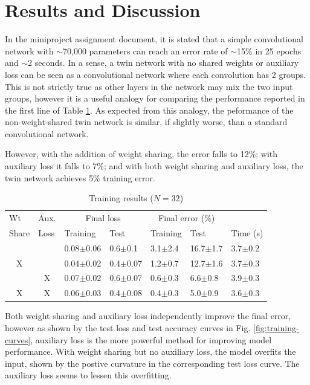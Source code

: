 \documentclass[prl, article, twocolumn]{revtex4-1}
\begin{document}
\section{Results and Discussion}
In the miniproject assignment document, it is stated that a simple convolutional network with $\sim$70,000 parameters can reach an error rate of $\sim$15\% in 25 epochs and $\sim$2 seconds. In a sense, a twin network with no shared weights or auxiliary loss can be seen as a convolutional network where each convolution has 2 groups. This is not strictly true as other layers in the network may mix the two input groups, however it is a useful analogy for comparing the performance reported in the first line of Table \ref{tab:results}. As expected from this analogy, the peformance of the non-weight-shared twin network is similar, if slightly worse, than a standard convolutional network.

However, with the addition of weight sharing, the error falls to 12\%; with auxiliary loss it falls to 7\%; and with both weight sharing and auxiliary loss, the twin network achieves 5\% training error.

\begin{table}[h!]
    \caption{Training results ($N=32$)}
    \label{tab:results}
    \begin{tabular}{cc|lllll}
    \multicolumn{1}{l}{Wt} & \multicolumn{1}{l|}{Aux.} & \multicolumn{2}{c}{Final loss} & \multicolumn{2}{c}{Final error (\%)} & \\
    \multicolumn{1}{l}{Share} & \multicolumn{1}{l|}{Loss} & Training & Test & Training & Test & Time (s) \\ \hline
       &   & 0.08$\pm$0.06 & 0.6$\pm$0.1 & 3.1$\pm$2.4 & 16.7$\pm$1.7 & 3.7$\pm$0.2  \\
    X  &   & 0.04$\pm$0.02 & 0.4$\pm$0.07 & 1.2$\pm$0.7 & 12.7$\pm$1.6 & 3.7$\pm$0.3  \\
       & X & 0.07$\pm$0.02 & 0.6$\pm$0.07 & 0.6$\pm$0.3 & 6.6$\pm$0.8 & 3.9$\pm$0.3  \\
    X  & X & 0.06$\pm$0.03 & 0.4$\pm$0.08 & 0.4$\pm$0.3 & 5.0$\pm$0.9 & 3.6$\pm$0.3 
    \end{tabular}
    \end{table}

Both weight sharing and auxiliary loss independently improve the final error, however as shown by the test loss and test accuracy curves in Fig. \ref{fig:training-curves}, auxiliary loss is the more powerful method for improving model performance. With weight sharing but no auxiliary loss, the model overfits the input, shown by the postive curvature in the corresponding test loss curve. The auxiliary loss seems to lessen this overfitting.
\end{document}
